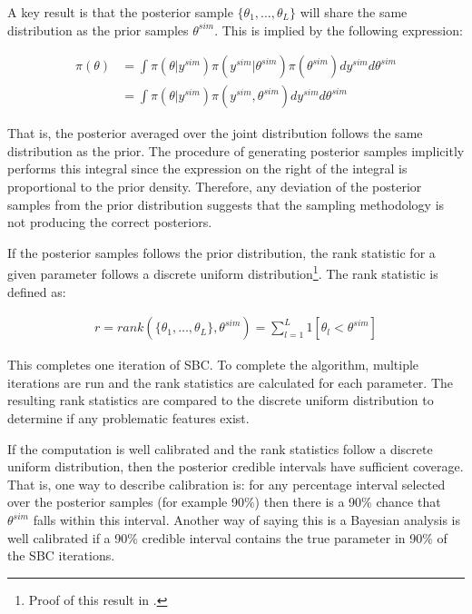 \documentclass[12pt, a4paper]{article}
\begin{document}
        A key result is that the posterior sample $\{\theta_1,\dots , \theta_{L}\}$ will share the same distribution as the prior samples $\theta^{sim}$. This is implied by the following expression:

        $$
        \begin{aligned}
        \pi(\theta) &= \int \pi(\theta|y^{sim}) \pi(y^{sim}|\theta^{sim}) \pi(\theta^{sim})dy^{sim} d\theta^{sim} \\
        &= \int \pi(\theta|y^{sim}) \pi(y^{sim},\theta^{sim}) dy^{sim} d\theta^{sim}
        \end{aligned}
        $$

        That is, the posterior averaged over the joint distribution follows the same distribution as the prior. The procedure of generating posterior samples implicitly performs this integral since the expression on the right of the integral is proportional to the prior density. Therefore, any deviation of the posterior samples from the prior distribution suggests that the sampling methodology is not producing the correct posteriors.

        If the posterior samples follows the prior distribution, the rank statistic for a given parameter follows a discrete uniform distribution\footnote{Proof of this result in \citet{talts2018validating}.}. The rank statistic is defined as:

        $$
        \begin{aligned}
        r = rank(\{\theta_1,\dots , \theta_{L}\}, \theta^{sim}) = \sum_{l=1}^{L}1[\theta_{l} < \theta^{sim}]
        \end{aligned}
        $$

        This completes one iteration of SBC. To complete the algorithm, multiple iterations are run and the rank statistics are calculated for each parameter. The resulting rank statistics are compared to the discrete uniform distribution to determine if any problematic features exist.

        If the computation is well calibrated and the rank statistics follow a discrete uniform distribution, then the posterior credible intervals have sufficient coverage. That is, one way to describe calibration is: for any percentage interval selected over the posterior samples (for example 90\%) then there is a 90\% chance that $\theta^{sim}$ falls within this interval. Another way of saying this is a Bayesian analysis is well calibrated if a 90\% credible interval contains the true parameter in 90\% of the SBC iterations. 
\end{document}
